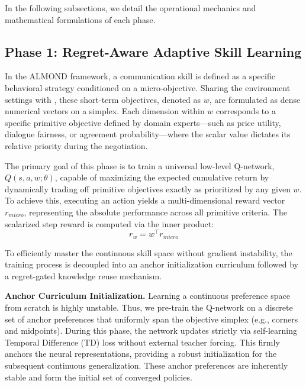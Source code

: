 \documentclass[conference]{IEEEtran}
\begin{document}
In the following subsections, we detail the operational mechanics and mathematical formulations of each phase.

\subsection{Phase 1: Regret-Aware Adaptive Skill Learning}

In the ALMOND framework, a communication skill is defined as a specific behavioral strategy conditioned on a micro-objective. Sharing the environment settings with \cite{dao-liao-2025-one}, these short-term objectives, denoted as $w$, are formulated as dense numerical vectors on a simplex. Each dimension within $w$ corresponds to a specific primitive objective defined by domain experts---such as price utility, dialogue fairness, or agreement probability---where the scalar value dictates its relative priority during the negotiation. 

The primary goal of this phase is to train a universal low-level Q-network, $Q(s, a, w; \theta)$, capable of maximizing the expected cumulative return by dynamically trading off primitive objectives exactly as prioritized by any given $w$. To achieve this, executing an action yields a multi-dimensional reward vector $r_{micro}$, representing the absolute performance across all primitive criteria. The scalarized step reward is computed via the inner product:
\begin{equation}
    r_w = w^{\top} r_{micro}
\end{equation}

To efficiently master the continuous skill space without gradient instability, the training process is decoupled into an anchor initialization curriculum followed by a regret-gated knowledge reuse mechanism.

\textbf{Anchor Curriculum Initialization.} Learning a continuous preference space from scratch is highly unstable. Thus, we pre-train the Q-network on a discrete set of anchor preferences that uniformly span the objective simplex (e.g., corners and midpoints). During this phase, the network updates strictly via self-learning Temporal Difference (TD) loss without external teacher forcing. This firmly anchors the neural representations, providing a robust initialization for the subsequent continuous generalization. These anchor preferences are inherently stable and form the initial set of converged policies.
\end{document}
